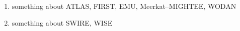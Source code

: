 





    \begin{enumerate}
        \item something about ATLAS, FIRST, EMU, Meerkat--MIGHTEE, WODAN
        \item something about SWIRE, WISE
    \end{enumerate}
